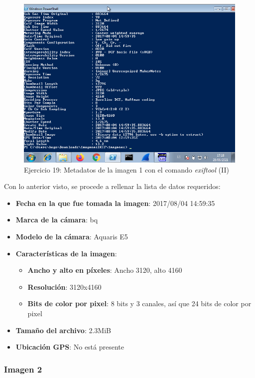 \documentclass[11pt]{article}
\begin{document}
\begin{figure}[H]
    \caption{Ejercicio 19: Metadatos de la imagen 1 con el comando \textit{exiftool} (II)}
    \centering
    \includegraphics[scale=0.7]{p03/e19-4.png}
\end{figure}

Con lo anterior visto, se procede a rellenar la lista de datos requeridos:

\begin{itemize}
    \item \textbf{Fecha en la que fue tomada la imagen}: 2017/08/04 14:59:35 
    \item \textbf{Marca de la cámara}: bq
    \item \textbf{Modelo de la cámara}: Aquaris E5
    \item \textbf{Características de la imagen}:
        \begin{itemize}
            \item \textbf{Ancho y alto en píxeles}: Ancho 3120, alto 4160
            \item \textbf{Resolución}: 3120x4160
            \item \textbf{Bits de color por pixel}: 8 bits y 3 canales, así que 24 bits de color por pixel
        \end{itemize}
    \item \textbf{Tamaño del archivo}: 2.3MiB
    \item \textbf{Ubicación GPS}: No está presente
\end{itemize}


\subsubsection{Imagen 2}
\end{document}

